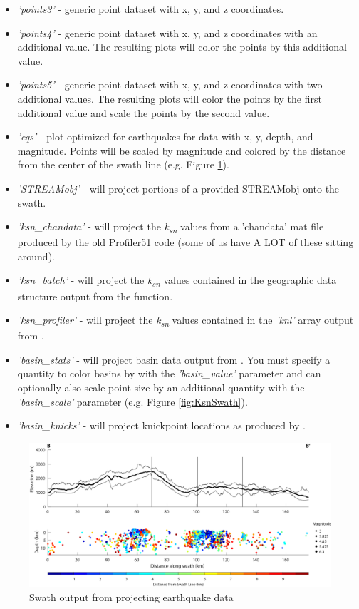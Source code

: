 \begin{itemize}
	\item \textit{'points3'} - generic point dataset with x, y, and z coordinates.
	\item \textit{'points4'} - generic point dataset with x, y, and z coordinates with an additional value. The resulting plots will color the points by this additional value.
	\item \textit{'points5'} - generic point dataset with x, y, and z coordinates with two additional values. The resulting plots will color the points by the first additional value and scale the points by the second value.
	\item \textit{'eqs'} - plot optimized for earthquakes for data with x, y, depth, and magnitude. Points will be scaled by magnitude and colored by the distance from the center of the swath line (e.g. Figure \ref{fig:EqSwath}).
	\item \textit{'STREAMobj'} - will project portions of a provided STREAMobj onto the swath.
	\item \textit{'ksn\_chandata'} - will project the \textit{k\textsubscript{sn}} values from a 'chandata' mat file produced by the old Profiler51 code (some of us have A LOT of these sitting around).
	\item \textit{'ksn\_batch'} - will project the \textit{k\textsubscript{sn}} values contained in the geographic data structure output from the  function.
	\item \textit{'ksn\_profiler'} - will project the \textit{k\textsubscript{sn}} values contained in the \textit{'knl'} array output from .
	\item \textit{'basin\_stats'} - will project basin data output from . You must specify a quantity to color basins by with the \textit{'basin\_value'} parameter and can optionally also scale point size by an additional quantity with the \textit{'basin\_scale'} parameter (e.g. Figure \ref{fig:KsnSwath}).
	\item \textit{'basin\_knicks'} - will project knickpoint locations as produced by .
\end{itemize}

\begin{figure}[H]
	\centering
	\includegraphics[width=16.5cm]{PNGs/SanBern_EQSwath.png}
	\caption{Swath output from  projecting earthquake data}
	\label{fig:EqSwath}
\end{figure}


